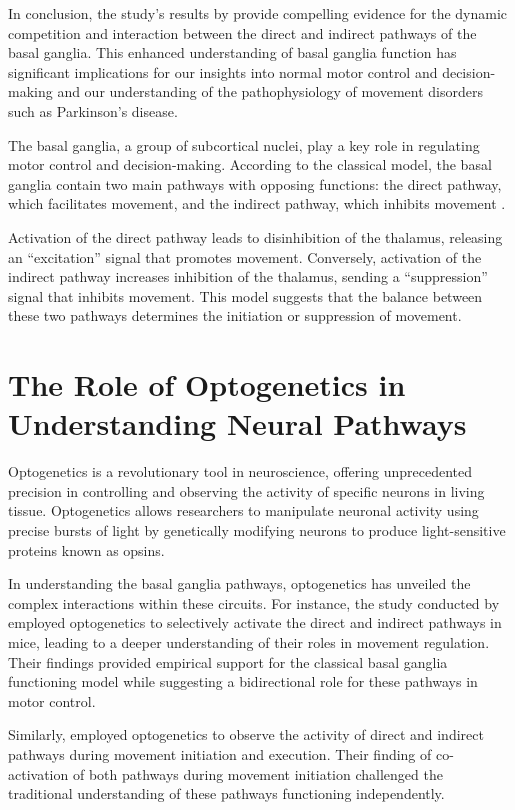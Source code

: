 \documentclass[10pt]{article}
\begin{document}
\begin{sloppypar}
  In conclusion, the study’s results by \citeauthor{cui_concurrent_2013} provide compelling evidence for the dynamic competition and interaction between the direct and indirect pathways of the basal ganglia. This enhanced understanding of basal ganglia function has significant implications for our insights into normal motor control and decision-making and our understanding of the pathophysiology of movement disorders such as Parkinson’s disease.

  The basal ganglia, a group of subcortical nuclei, play a key role in regulating motor control and decision-making. According to the classical model, the basal ganglia contain two main pathways with opposing functions: the direct pathway, which facilitates movement, and the indirect pathway, which inhibits movement \citep{kravitz_regulation_2010}.

  Activation of the direct pathway leads to disinhibition of the thalamus, releasing an “excitation” signal that promotes movement. Conversely, activation of the indirect pathway increases inhibition of the thalamus, sending a “suppression” signal that inhibits movement. This model suggests that the balance between these two pathways determines the initiation or suppression of movement.

  \section{The Role of Optogenetics in Understanding Neural Pathways}
  \label{sec:the-role-of-optogenetics-in-understanding-neural-pathways}
  Optogenetics is a revolutionary tool in neuroscience, offering unprecedented precision in controlling and observing the activity of specific neurons in living tissue. Optogenetics allows researchers to manipulate neuronal activity using precise bursts of light by genetically modifying neurons to produce light-sensitive proteins known as opsins.

  In understanding the basal ganglia pathways, optogenetics has unveiled the complex interactions within these circuits. For instance, the study conducted by \cite{kravitz_regulation_2010} employed optogenetics to selectively activate the direct and indirect pathways in mice, leading to a deeper understanding of their roles in movement regulation. Their findings provided empirical support for the classical basal ganglia functioning model while suggesting a bidirectional role for these pathways in motor control.

  Similarly, \cite{cui_concurrent_2013} employed optogenetics to observe the activity of direct and indirect pathways during movement initiation and execution. Their finding of co-activation of both pathways during movement initiation challenged the traditional understanding of these pathways functioning independently.


\end{sloppypar}
\end{document}
